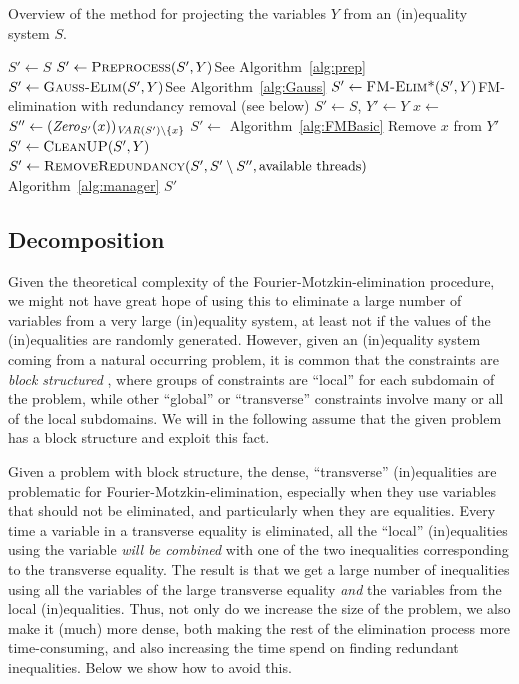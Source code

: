 \begin{algorithm}\caption{Overview of the method for projecting the variables $Y$ from an (in)equality system  $S$.}\label{alg:project}
\begin{algorithmic}[1]
	\State $S'\gets S$
	\State $S'\gets\Call{Preprocess}{S',Y}$\Comment See Algorithm~\ref{alg:prep}
	\State $S'\gets\Call{Gauss-Elim}{S',Y}$\Comment See Algorithm~\ref{alg:Gauss} 
	\State $S'\gets \Call{FM-Elim*}{S',Y}$\Comment FM-elimination with redundancy removal (see below)
\EndFunction
\Statex
{}
	\State  $S'\gets S$, $Y'\gets Y$
		\State $x\gets$ 
		\State $S''\gets(\mathit{Zero}_{S'}(x))_{\mathit{VAR}(S')\setminus\{x\}}$
		\State $S' \gets$  \Comment Algorithm~\ref{alg:FMBasic}
		\State Remove $x$ from $Y'$
		\State $S'\gets\Call{CleanUP}{S',Y}$
		\State $S'\gets \Call{RemoveRedundancy}{S', S'\setminus S'', \text{available threads}}$ 	\Comment Algorithm~\ref{alg:manager}\label{ln:projx}
	\EndWhile
	\State \Return $S'$
\EndFunction
\end{algorithmic}
\end{algorithm}
%
\subsection{Decomposition}\label{sec:decomp}
Given the theoretical complexity of the Fourier\--Motzkin\--elimination procedure, we might not have great hope of using this to eliminate a large number of variables from a very large (in)equality system, at least not if the values of the (in)equalities are randomly generated.
%
However, given an (in)equality system coming from a natural occurring problem, it is common that the constraints are \emph{block structured} \cite{williams}, where groups of constraints are ``local'' for each subdomain of the problem, while other ``global'' or ``transverse'' constraints involve many or all of the local subdomains. We will in the following assume that the given problem has a block structure and exploit this fact. 

Given a problem with block structure, the dense, ``transverse'' (in)equalities are problematic for Fourier-Motzkin-elimination, especially when they use variables that should not be eliminated, and particularly when they are equalities. 
Every time a variable in a transverse equality is eliminated, all the ``local'' (in)equalities using the variable \emph{will be combined} with one of the two inequalities corresponding to the transverse equality. The result is that we get a large number of inequalities using all the variables of the large transverse equality \emph{and} the variables from the local (in)equalities. Thus, not only do we increase the size of the problem, we also make it (much) more dense, both making the rest of the elimination process more time-consuming, and also increasing the time spend on finding redundant inequalities.
%
{Below we show how to avoid this.}
